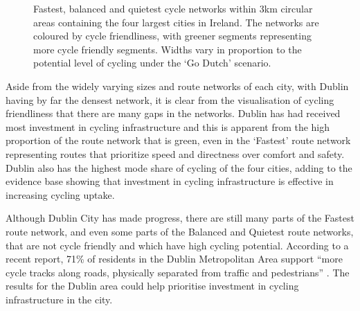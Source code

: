 \documentclass[
  super,
  preprint,
  3p]{elsarticle}
\begin{document}
\begin{figure}


\caption{\label{fig-city-results}Fastest, balanced and quietest cycle
networks within 3km circular areas containing the four largest cities in
Ireland. The networks are coloured by cycle friendliness, with greener
segments representing more cycle friendly segments. Widths vary in
proportion to the potential level of cycling under the `Go Dutch'
scenario.}

\end{figure}%

Aside from the widely varying sizes and route networks of each city,
with Dublin having by far the densest network, it is clear from the
visualisation of cycling friendliness that there are many gaps in the
networks. Dublin has had received most investment in cycling
infrastructure and this is apparent from the high proportion of the
route network that is green, even in the `Fastest' route network
representing routes that prioritize speed and directness over comfort
and safety. Dublin also has the highest mode share of cycling of the
four cities, adding to the evidence base showing that investment in
cycling infrastructure is effective in increasing cycling uptake.

Although Dublin City has made progress, there are still many parts of
the Fastest route network, and even some parts of the Balanced and
Quietest route networks, that are not cycle friendly and which have high
cycling potential. According to a recent report, 71\% of residents in
the Dublin Metropolitan Area support ``more cycle tracks along roads,
physically separated from traffic and pedestrians'' \citep{walking2021}.
The results for the Dublin area could help prioritise investment in
cycling infrastructure in the city.
\end{document}
